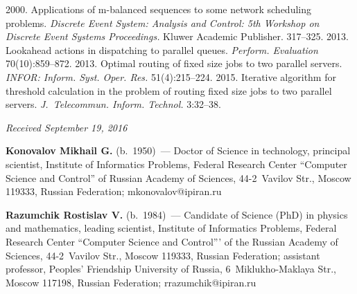 \begin{multicols}{2}
{{\begin{thebibliography}{99}
     2000. Applications of \mbox{m-balanced} sequences to some 
network scheduling problems.
 \textit{Discrete Event System: Analysis and Control: 5th 
Workshop on Discrete Event Systems Proceedings.} Kluwer Academic 
Publisher. 317--325.
     2013. Lookahead actions in dispatching to parallel 
queues. \textit{Perform. Evaluation} 70(10):859--872.
     2013. Optimal routing of fixed size jobs to two parallel 
servers. \textit{INFOR: Inform. Syst. Oper. Res.} 51(4):215--224.
     2015. Iterative algorithm for threshold 
calculation in the problem of routing fixed size jobs to two parallel servers. 
\textit{J.~Telecommun. Inform. Technol.} 3:32--38.
    
\end{thebibliography}

 }
 }

\end{multicols}

\vspace*{-3pt}

\hfill{\small\textit{Received September 19, 2016}}    
    
    \Contr
    
    \noindent
    \textbf{Konovalov Mikhail G.} (b.\ 1950)~---
    Doctor of Science in technology, principal scientist, Institute of Informatics Problems, Federal 
Research Center ``Computer Science and Control'' of Russian Academy of Sciences, 44-2~Vavilov Str., 
Moscow 119333, Russian Federation; \mbox{mkonovalov@ipiran.ru}
    
    \vspace*{3pt}
    
    \noindent
    \textbf{Razumchik Rostislav V.} (b.\ 1984)~--- Candidate of Science (PhD) in physics and 
mathematics, leading scientist, Institute of Informatics Problems, Federal Research Center ``Computer 
Science and Control''' of the Russian Academy of Sciences, 44-2~Vavilov Str., Moscow 119333, Russian 
Federation; assistant professor, Peoples' Friendship University of Russia, 6~Miklukho-Maklaya Str., 
Moscow 117198, Russian Federation; \mbox{rrazumchik@ipiran.ru} 
    
\label{end\stat}


\renewcommand{\bibname}{\protect\rm Литература} 